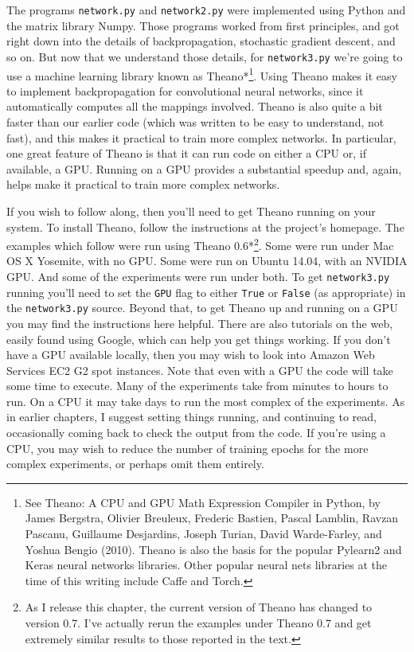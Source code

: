 The programs \texttt{network.py} and \texttt{network2.py} were implemented using Python and the matrix library Numpy. Those programs worked from first principles, and got right down into the details of backpropagation, stochastic gradient descent, and so on. But now that we understand those details, for \texttt{network3.py} we're going to use a machine learning library known as Theano*\footnote{See Theano: A CPU and GPU Math Expression Compiler in Python, by James Bergstra, Olivier Breuleux, Frederic Bastien, Pascal Lamblin, Ravzan Pascanu, Guillaume Desjardins, Joseph Turian, David Warde-Farley, and Yoshua Bengio (2010). Theano is also the basis for the popular Pylearn2 and Keras neural networks libraries. Other popular neural nets libraries at the time of this writing include Caffe and Torch.}. Using Theano makes it easy to implement backpropagation for convolutional neural networks, since it automatically computes all the mappings involved. Theano is also quite a bit faster than our earlier code (which was written to be easy to understand, not fast), and this makes it practical to train more complex networks. In particular, one great feature of Theano is that it can run code on either a CPU or, if available, a GPU. Running on a GPU provides a substantial speedup and, again, helps make it practical to train more complex networks.


If you wish to follow along, then you'll need to get Theano running on your system. To install Theano, follow the instructions at the project's homepage. The examples which follow were run using Theano 0.6*\footnote{As I release this chapter, the current version of Theano has changed to version 0.7. I've actually rerun the examples under Theano 0.7 and get extremely similar results to those reported in the text.}. Some were run under Mac OS X Yosemite, with no GPU. Some were run on Ubuntu 14.04, with an NVIDIA GPU. And some of the experiments were run under both. To get \texttt{network3.py} running you'll need to set the \texttt{GPU} flag to either \texttt{True} or \texttt{False} (as appropriate) in the \texttt{network3.py} source. Beyond that, to get Theano up and running on a GPU you may find the instructions here helpful. There are also tutorials on the web, easily found using Google, which can help you get things working. If you don't have a GPU available locally, then you may wish to look into Amazon Web Services EC2 G2 spot instances. Note that even with a GPU the code will take some time to execute. Many of the experiments take from minutes to hours to run. On a CPU it may take days to run the most complex of the experiments. As in earlier chapters, I suggest setting things running, and continuing to read, occasionally coming back to check the output from the code. If you're using a CPU, you may wish to reduce the number of training epochs for the more complex experiments, or perhaps omit them entirely.


